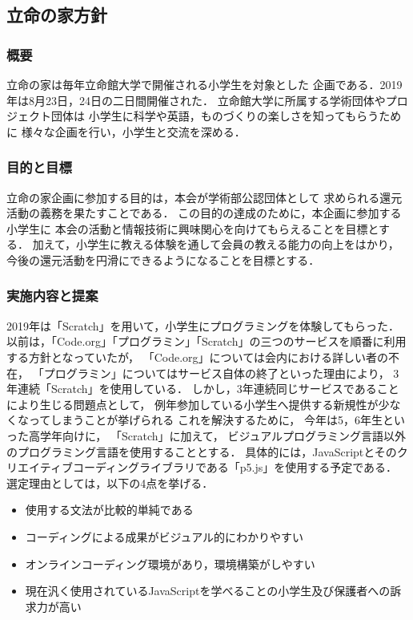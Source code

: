 \subsection*{立命の家方針}


\subsubsection*{概要}
立命の家は毎年立命館大学で開催される小学生を対象とした
企画である．2019年は8月23日，24日の二日間開催された．
立命館大学に所属する学術団体やプロジェクト団体は
小学生に科学や英語，ものづくりの楽しさを知ってもらうために
様々な企画を行い，小学生と交流を深める．

\subsubsection*{目的と目標}
立命の家企画に参加する目的は，本会が学術部公認団体として
求められる還元活動の義務を果たすことである．
この目的の達成のために，本企画に参加する小学生に
本会の活動と情報技術に興味関心を向けてもらえることを目標とする．
加えて，小学生に教える体験を通して会員の教える能力の向上をはかり，
今後の還元活動を円滑にできるようになることを目標とする．

\subsubsection*{実施内容と提案}
2019年は「Scratch」を用いて，小学生にプログラミングを体験してもらった．
以前は，「Code.org」「プログラミン」「Scratch」の三つのサービスを順番に利用する方針となっていたが，
「Code.org」については会内における詳しい者の不在，
「プログラミン」についてはサービス自体の終了といった理由により，
3年連続「Scratch」を使用している．
しかし，3年連続同じサービスであることにより生じる問題点として，
例年参加している小学生へ提供する新規性が少なくなってしまうことが挙げられる
これを解決するために，
今年は5，6年生といった高学年向けに，
「Scratch」に加えて，
ビジュアルプログラミング言語以外のプログラミング言語を使用することとする．
具体的には，JavaScriptとそのクリエイティブコーディングライブラリである「p5.js」を使用する予定である．
選定理由としては，以下の4点を挙げる．

\begin {itemize}
    \item 使用する文法が比較的単純である
    \item コーディングによる成果がビジュアル的にわかりやすい
    \item オンラインコーディング環境があり，環境構築がしやすい
    \item 現在汎く使用されているJavaScriptを学べることの小学生及び保護者への訴求力が高い
\end {itemize}


